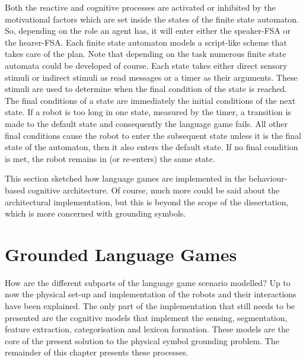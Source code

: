 Both the reactive and cognitive processes are activated or inhibited by the motivational factors which are set inside the states of the finite state automaton. So, depending on the role an agent has, it will enter either the speaker-FSA or the hearer-FSA. Each finite state automaton models a script-like scheme that takes care of the plan. Note that depending on the task numerous finite state automata could be developed of course. Each state takes either direct sensory stimuli or indirect stimuli as read messages or a timer as their arguments. These stimuli are used to determine when the final condition of the state is reached. The final conditions of a state are immediately the initial conditions of the next state. If a robot is too long in one state, measured by the timer, a transition is made to the default state and consequently the language game fails. All other final conditions cause the robot to enter the subsequent state unless it is the final state of the automaton, then it also enters the default state. If no final condition is met, the robot remains in (or re-enters) the same state.

This section sketched how language games are implemented in the behaviour-based cognitive architecture. Of course, much more could be said about the architectural implementation, but this is beyond the scope of the dissertation, which is more concerned with grounding symbols.

\section{Grounded Language Games}

How are the different subparts of the language game scenario modelled? Up to now the physical set-up and implementation of the robots and their interactions have been explained. The only part of the implementation that still needs to be presented are the cognitive models that implement the sensing, segmentation, feature extraction, categorisation and lexicon formation. These models are the core of the present solution to the physical symbol grounding problem. The remainder of this chapter presents these processes.



